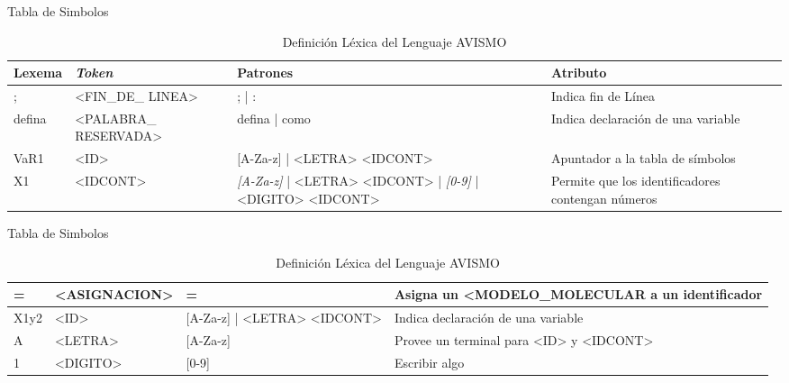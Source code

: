 \documentclass[14pt, aspectratio=169]{beamer}
\begin{document}
\begin{frame}{Tabla de Simbolos}
    
\begin{table}[ht]
    \footnotesize
    \begin{tabularx}{\linewidth}{|X|X|X|X|}
        \hline
        Lexema & \textit{Token}        & Patrones                                                              & Atributo                                          \\\hline
        ;      & <FIN\_DE\_ LINEA>     & ; | :                                                                 & Indica fin de Línea                               \\\hline
        defina & <PALABRA\_ RESERVADA> & defina | como                                                         & Indica declaración de una variable                \\\hline
        VaR1   & <ID>                  & [A-Za-z] | <LETRA> <IDCONT>                                           & Apuntador a la tabla de símbolos                  \\\hline
        X1     & <IDCONT>              & \textit{[A-Za-z]} | <LETRA> <IDCONT> | \textit{[0-9]} | <DIGITO> <IDCONT> & Permite que los identificadores contengan números \\\hline
    \end{tabularx}
    \label{table: lexTable1}
    \caption{Definición Léxica del Lenguaje AVISMO}
\end{table}
\end{frame}

\begin{frame}{Tabla de Simbolos}

\begin{table}[ht]
    \footnotesize
    \begin{tabularx}{\linewidth}{|X|X|X|X|}
        \hline
        =      & <ASIGNACION>          & =                                                                     & Asigna un <MODELO\_MOLECULAR a un identificador   \\\hline
        X1y2   & <ID>                  & [A-Za-z] | <LETRA> <IDCONT>                                           & Indica declaración de una variable                \\\hline
        A      & <LETRA>               & [A-Za-z]                                                              & Provee un terminal para <ID> y <IDCONT>           \\\hline
        1      & <DIGITO>              & [0-9]                                                                 & Escribir algo                                     \\\hline
    \end{tabularx}
    \label{table: lexTable2}
    \caption{Definición Léxica del Lenguaje AVISMO}
\end{table}
\end{frame}
\end{document}
